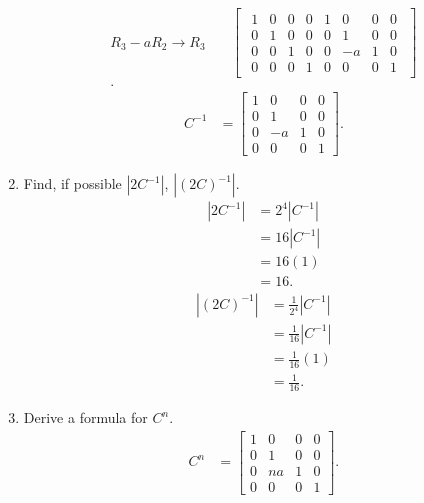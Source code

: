 \documentclass{zc-ust-hw}
\begin{document}
\begin{enumerate}[label=\roman*.]
\begin{align}
      R_3 - aR_2 \rightarrow R_3
      &\quad
      \begin{bmatrix} 
        \begin{array}{cccc|cccc}
          1 & 0 & 0 & 0 & 1 & 0 & 0 & 0 \\
          0 & 1 & 0 & 0 & 0 & 1 & 0 & 0 \\
          0 & 0 & 1 & 0 & 0 & -a & 1 & 0 \\
          0 & 0 & 0 & 1 & 0 & 0 & 0 & 1
        \end{array}
      \end{bmatrix} \\
    .\end{align}
    \begin{align}
      C^{-1} &=
      \begin{bmatrix} 
        1 & 0 & 0 & 0 \\
        0 & 1 & 0 & 0 \\
        0 & -a & 1 & 0 \\
        0 & 0 & 0 & 1
      \end{bmatrix}
    .\end{align}
  \item Find, if possible $\left|2C^{-1}\right|$, $\left|\left( 2C \right)^{-1}\right|$.
    \begin{align}
      \left| 2C^{-1} \right| &= 2^4\left| C^{-1} \right| \\
                             &= 16\left| C^{-1} \right| \\
                             &= 16\left( 1 \right) \\
                             &= 16
    .\end{align}
    \begin{align}
      \left| \left( 2C \right)^{-1} \right| &= \frac{1}{2^4}\left| C^{-1} \right| \\
                                            &= \frac{1}{16}\left| C^{-1} \right| \\
                                            &= \frac{1}{16}\left( 1 \right) \\
                                            &= \frac{1}{16}
    .\end{align}
  \item Derive a formula for $C^n$.
    \begin{align}
      C^n &=
      \begin{bmatrix} 
        1 & 0 & 0 & 0 \\
        0 & 1 & 0 & 0 \\
        0 & na & 1 & 0 \\
        0 & 0 & 0 & 1
      \end{bmatrix}
    .\end{align}
\end{enumerate}
\end{document}
